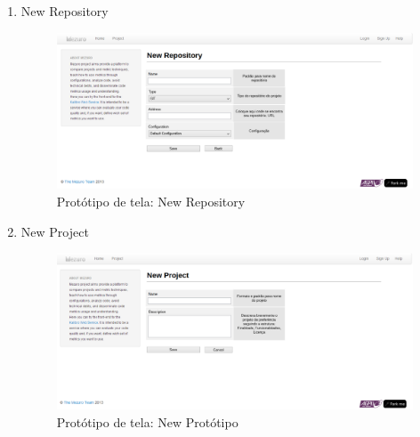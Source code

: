 \begin{enumerate}
\item New Repository
\begin{figure}[H]
  \begin{center}
    \includegraphics[width=1\textwidth]{figuras/NewRepository.eps}
    \caption{Protótipo de tela: New Repository}
    \label{fig:pNewRepository}
  \end{center}
\end{figure}

\item New Project
\begin{figure}[H]
  \begin{center}
    \includegraphics[width=1\textwidth]{figuras/NewProject.eps}
    \caption{Protótipo de tela: New Protótipo}
    \label{fig:pNewPrototipo}
  \end{center}
\end{figure}
\end{enumerate}